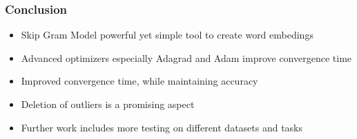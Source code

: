 \begin{frame}
\frametitle{Conclusion} 
\begin{itemize}
\item Skip Gram Model powerful yet simple tool to create word embedings
\item Advanced optimizers especially Adagrad and Adam improve convergence time 
\item Improved convergence time, while maintaining accuracy
\item Deletion of outliers is a promising aspect 
\item Further work includes more testing on different datasets and tasks
\end{itemize}
\end{frame}